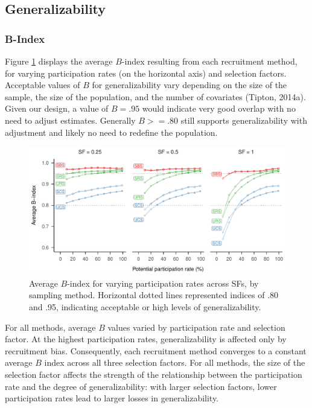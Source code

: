 \documentclass[
  english,
  man,floatsintext]{apa6}
\begin{document}
\hypertarget{generalizability-1}{%
\subsection*{Generalizability}\label{generalizability-1}}

\hypertarget{b-index}{%
\subsubsection*{B-Index}\label{b-index}}

Figure \ref{fig:fig-avg-B} displays the average \(B\)-index resulting from each recruitment method, for varying participation rates (on the horizontal axis) and selection factors. Acceptable values of \(B\) for generalizability vary depending on the size of the sample, the size of the population, and the number of covariates (Tipton, 2014a). Given our design, a value of \(B = .95\) would indicate very good overlap with no need to adjust estimates. Generally \(B >= .80\) still supports generalizability with adjustment and likely no need to redefine the population.



\begin{figure}
\centering
\includegraphics{6---Paper_files/figure-latex/fig-avg-B-1.pdf}
\caption{\label{fig:fig-avg-B}Average \(B\)-index for varying participation rates across SFs, by sampling method. Horizontal dotted lines represented indices of .80 and .95, indicating acceptable or high levels of generalizability.}
\end{figure}

For all methods, average \(B\) values varied by participation rate and selection factor. At the highest participation rates, generalizability is affected only by recruitment bias. Consequently, each recruitment method converges to a constant average \(B\) index across all three selection factors. For all methods, the size of the selection factor affects the strength of the relationship between the participation rate and the degree of generalizability: with larger selection factors, lower participation rates lead to larger losses in generalizability.
\end{document}
